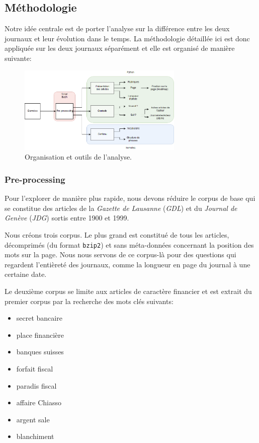 \hypertarget{muxe9thodologie}{%
\subsection{Méthodologie}\label{muxe9thodologie}}

Notre idée centrale est de porter l'analyse sur la différence entre les
deux journaux et leur évolution dans le temps. La méthodologie détaillée
ici est donc appliquée sur les deux journaux séparément et elle est
organisé de manière suivante:

\begin{figure}
\centering
\includegraphics[width=0.7\textwidth,height=\textheight]{methods.png}
\caption{Organisation et outils de l'analyse.}
\end{figure}

\hypertarget{pre-processing}{%
\subsubsection{Pre-processing}\label{pre-processing}}

Pour l'explorer de manière plus rapide, nous devons réduire le corpus de
base qui se constitue des articles de la \emph{Gazette de Lausanne}
(\emph{GDL}) et du \emph{Journal de Genève} (\emph{JDG}) sortis entre
1900 et 1999.

Nous créons trois corpus. Le plus grand est constitué de tous les
articles, décomprimés (du format \texttt{bzip2}) et sans méta-données
concernant la position des mots sur la page. Nous nous servons de ce
corpus-là pour des questions qui regardent l'entièreté des journaux,
comme la longueur en page du journal à une certaine date.

Le deuxième corpus se limite aux articles de caractère financier et est
extrait du premier corpus par la recherche des mots clés suivants:

\begin{itemize}
\tightlist
\item
  secret bancaire
\item
  place financière
\item
  banques suisses
\item
  forfait fiscal
\item
  paradis fiscal
\item
  affaire Chiasso
\item
  argent sale
\item
  blanchiment
\end{itemize}

